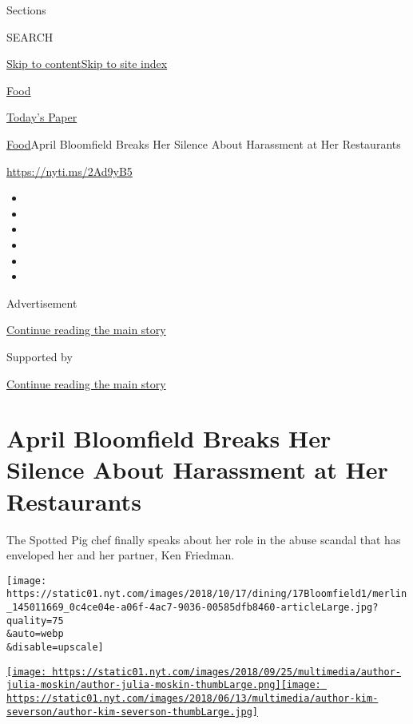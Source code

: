 Sections

SEARCH

\protect\hyperlink{site-content}{Skip to
content}\protect\hyperlink{site-index}{Skip to site index}

\href{https://www.nytimes.com/section/food}{Food}

\href{https://myaccount.nytimes.com/auth/login?response_type=cookie\&client_id=vi}{}

\href{https://www.nytimes.com/section/todayspaper}{Today's Paper}

\href{/section/food}{Food}\textbar{}April Bloomfield Breaks Her Silence
About Harassment at Her Restaurants

\url{https://nyti.ms/2Ad9yB5}

\begin{itemize}
\item
\item
\item
\item
\item
\item
\end{itemize}

Advertisement

\protect\hyperlink{after-top}{Continue reading the main story}

Supported by

\protect\hyperlink{after-sponsor}{Continue reading the main story}

\hypertarget{april-bloomfield-breaks-her-silence-about-harassment-at-her-restaurants}{%
\section{April Bloomfield Breaks Her Silence About Harassment at Her
Restaurants}\label{april-bloomfield-breaks-her-silence-about-harassment-at-her-restaurants}}

The Spotted Pig chef finally speaks about her role in the abuse scandal
that has enveloped her and her partner, Ken Friedman.

\texttt{[image: https://static01.nyt.com/images/2018/10/17/dining/17Bloomfield1/merlin\_145011669\_0c4ce04e-a06f-4ac7-9036-00585dfb8460-articleLarge.jpg?quality=75\\\&auto=webp\\\&disable=upscale]}

\href{https://www.nytimes.com/by/julia-moskin}{\texttt{[image: https://static01.nyt.com/images/2018/09/25/multimedia/author-julia-moskin/author-julia-moskin-thumbLarge.png]}}\href{https://www.nytimes.com/by/kim-severson}{\texttt{[image: https://static01.nyt.com/images/2018/06/13/multimedia/author-kim-severson/author-kim-severson-thumbLarge.jpg]}}

